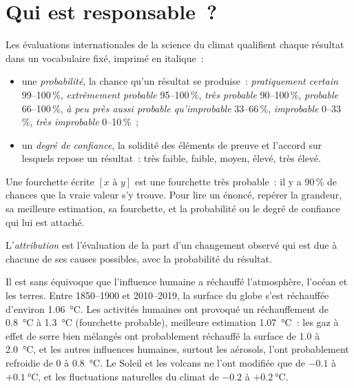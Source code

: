 \section{Qui est responsable~?}

\begin{method}\label{met:g12:climate-change:language}
Les évaluations internationales de la science du climat qualifient chaque
résultat dans un vocabulaire fixé, imprimé en italique~:
\begin{itemize}
  \item une \emph{probabilité}, la chance qu'un résultat se produise~:
        \emph{pratiquement certain} 99--100\,\%, \emph{extrêmement probable}
        95--100\,\%, \emph{très probable} 90--100\,\%, \emph{probable}
        66--100\,\%, \emph{à peu près aussi probable qu'improbable}
        33--66\,\%, \emph{improbable} 0--33\,\%, \emph{très improbable}
        0--10\,\%~;
  \item un \emph{degré de confiance}, la solidité des éléments de preuve et
        l'accord sur lesquels repose un résultat~: très faible, faible,
        moyen, élevé, très élevé.
\end{itemize}
Une fourchette écrite $[x \text{ à } y]$ est une fourchette très probable~:
il y a 90\,\% de chances que la vraie valeur s'y trouve. Pour lire un
énoncé, repérer la grandeur, sa meilleure estimation, sa fourchette, et la
probabilité ou le degré de confiance qui lui est attaché.
\end{method}

\begin{definition}[Attribution]\label{def:g12:climate-change:attribution}
L'\emph{attribution} est l'évaluation de la part d'un
changement observé qui est due à chacune de ses causes possibles, avec la
probabilité du résultat.
\end{definition}

\begin{proposition}\label{prop:g12:climate-change:attribution}
Il est sans équivoque que l'influence humaine a réchauffé l'atmosphère,
l'océan et les terres. Entre 1850--1900 et 2010--2019, la surface du globe
s'est réchauffée d'environ \qty{1.06}{\degreeCelsius}. Les activités
humaines ont provoqué un réchauffement de \qty{0.8}{\degreeCelsius} à
\qty{1.3}{\degreeCelsius} (fourchette probable), meilleure estimation
\qty{1.07}{\degreeCelsius}~: les gaz à effet de serre bien mélangés ont
probablement réchauffé la surface de 1.0 à \qty{2.0}{\degreeCelsius},
et les autres influences humaines, surtout les aérosols, l'ont
probablement refroidie de 0 à \qty{0.8}{\degreeCelsius}. Le Soleil
et les volcans ne l'ont modifiée que de $-0.1$
à $+\qty{0.1}{\degreeCelsius}$, et les fluctuations naturelles du climat
de $-0.2$ à $+\qty{0.2}{\degreeCelsius}$.
\end{proposition}

